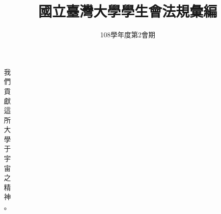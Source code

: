 \title{\huge 國立臺灣大學學生會法規彙編} %
\date{108學年度第2會期} %
\usepackage{titling}
\setlength{\droptitle}{-8em} %

\usepackage{fancyhdr}
\usepackage{lastpage}
\pagestyle{fancyplain}
\lhead{} %
\rhead{\fancyplain{}} %
\lfoot{} %
\cfoot{} %
\rfoot{}

\renewcommand*\contentsname{目錄}



\clearpage

\maketitle %

\newpage
\thispagestyle{empty}
\vspace*{\fill}
\begin{center}
\end{center}
\vspace*{\fill}

\newpage
\thispagestyle{empty}
\vspace*{\fill}
\begin{center}
\huge {\fontheiti 我\\們\\貢\\獻\\這\\所\\大\\學\\于\\宇\\宙\\之\\精\\神\\。}
\end{center}
\vspace*{\fill}

\newpage
\thispagestyle{empty}
\vspace*{\fill}
\begin{center}
\end{center}
\vspace*{\fill}

\newpage
\tableofcontents{}
